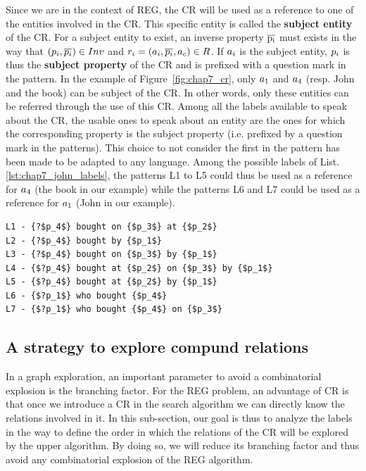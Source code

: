 Since we are in the context of REG, the CR will be used as a reference to one of the entities involved in the CR. This specific entity is called the \textbf{subject entity} of the CR. 
For a subject entity to exist, an inverse property $\overline{\rm p_i}$ must exists in the way that $(p_i, \overline{p_i}) \in Inv$ and $r_i = (a_i, \overline{p_i}, a_c) \in R$. If $a_i$ is the subject entity, $p_i$ is thus the \textbf{subject property} of the CR and is prefixed with a question mark in the pattern. In the example of Figure~\ref{fig:chap7_cr}, only $a_1$ and $a_4$ (resp. John and the book) can be subject of the CR. In other words, only these entities can be referred through the use of this CR. Among all the labels available to speak about the CR, the usable ones to speak about an entity are the ones for which the corresponding property is the subject property (i.e. prefixed by a question mark in the patterns). This choice to not consider the first in the pattern has been made to be adapted to any language. Among the possible labels of List.\ref{lst:chap7_john_labels}, the patterns L1 to L5 could thus be used as a reference for $a_4$ (the book in our example) while the patterns L6 and L7 could be used as a reference for $a_1$ (John in our example).

\begin{lstlisting}[frame=single, caption={ A part of the label set of the purchase compound relation.}, label={lst:chap7_john_labels}, captionpos=b, style=Labels, mathescape=true]
L1 - {?$p_4$} bought on {$p_3$} at {$p_2$}
L2 - {?$p_4$} bought by {$p_1$}
L3 - {?$p_4$} bought on {$p_3$} by {$p_1$}
L4 - {$?p_4$} bought at {$p_2$} on {$p_3$} by {$p_1$}
L5 - {$?p_4$} bought at {$p_2$} by {$p_1$}
L6 - {$?p_1$} who bought {$p_4$}
L7 - {$?p_1$} who bought {$p_4$} on {$p_3$}
\end{lstlisting}

\subsection{A strategy to explore compund relations}

In a graph exploration, an important parameter to avoid a combinatorial explosion is the branching factor. For the REG problem, an advantage of CR is that once we introduce a CR in the search algorithm we can directly know the relations involved in it. In this sub-section, our goal is thus to analyze the labels in the way to define the order in which the relations of the CR will be explored by the upper algorithm. By doing so, we will reduce its branching factor and thus avoid any combinatorial explosion of the REG algorithm.

